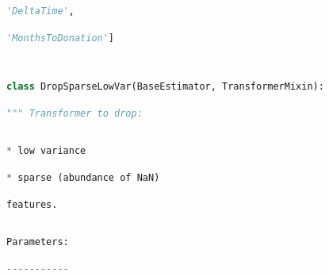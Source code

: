 \documentclass[
  11pt,
  a4paper,
  DIV=12,captions=tableheading,oneside]{scrbook}
\begin{document}
\begin{lstlisting}[language=Python,stepnumber=2,basicstyle=\footnotesize]
           'DeltaTime',\end{lstlisting}
\begin{lstlisting}[language=Python,stepnumber=2,basicstyle=\footnotesize]
           'MonthsToDonation']\end{lstlisting}
\begin{lstlisting}[language=Python,stepnumber=2,basicstyle=\footnotesize]
\end{lstlisting}
\begin{lstlisting}[language=Python,stepnumber=2,basicstyle=\footnotesize]
\end{lstlisting}
\begin{lstlisting}[language=Python,stepnumber=2,basicstyle=\footnotesize]
class DropSparseLowVar(BaseEstimator, TransformerMixin):\end{lstlisting}
\begin{lstlisting}[language=Python,stepnumber=2,basicstyle=\footnotesize]
    """ Transformer to drop:\end{lstlisting}
\begin{lstlisting}[language=Python,stepnumber=2,basicstyle=\footnotesize]
\end{lstlisting}
\begin{lstlisting}[language=Python,stepnumber=2,basicstyle=\footnotesize]
    * low variance\end{lstlisting}
\begin{lstlisting}[language=Python,stepnumber=2,basicstyle=\footnotesize]
    * sparse (abundance of NaN)\end{lstlisting}
\begin{lstlisting}[language=Python,stepnumber=2,basicstyle=\footnotesize]
    features.\end{lstlisting}
\begin{lstlisting}[language=Python,stepnumber=2,basicstyle=\footnotesize]
\end{lstlisting}
\begin{lstlisting}[language=Python,stepnumber=2,basicstyle=\footnotesize]
    Parameters:\end{lstlisting}
\begin{lstlisting}[language=Python,stepnumber=2,basicstyle=\footnotesize]
    -----------\end{lstlisting}
\begin{lstlisting}[language=Python,stepnumber=2,basicstyle=\footnotesize]
\end{lstlisting}
\end{document}
